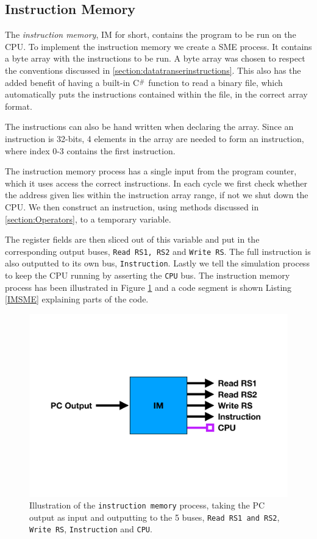     \subsection{Instruction Memory}
        The \textit{instruction memory}, IM for short, contains the program to be run on the CPU. To implement the instruction memory we create a SME process. It contains a byte array with the instructions to be run. A byte array was chosen to respect the conventions discussed in \ref{section:datatranserinstructions}. This also has the added benefit of having a built-in C$\scalerel*{\#}{X}$ function to read a binary file, which automatically puts the instructions contained within the file, in the correct array format. 
        
        The instructions can also be hand written when declaring the array. Since an instruction is 32-bits, 4 elements in the array are needed to form an instruction, where index 0-3 contains the first instruction.
        
        The instruction memory process has a single input from the program counter, which it uses access the correct instructions. In each cycle we first check whether the address given lies within the instruction array range, if not we shut down the CPU.
        We then construct an instruction, using methods discussed in \ref{section:Operators}, to a temporary variable.
        
        The register fields are then sliced out of this variable and put in the corresponding output buses, \texttt{Read RS1, RS2} and \texttt{Write RS}. The full instruction is also outputted to its own bus, \texttt{Instruction}. Lastly we tell the simulation process to keep the CPU running by asserting the \texttt{CPU} bus. The instruction memory process has been illustrated in Figure \ref{fig:IM} and a code segment is shown Listing \ref{IMSME} explaining parts of the code. 
     
        \begin{figure}[h!]
            \centering
            \includegraphics[scale=0.3]{pictures/IM.pdf}
            \caption{Illustration of the \texttt{instruction memory} process, taking the PC output as input and outputting to the 5 buses, \texttt{Read RS1 and RS2}, \texttt{Write RS}, \texttt{Instruction} and \texttt{CPU}.}
            \label{fig:IM}
        \end{figure}
    
